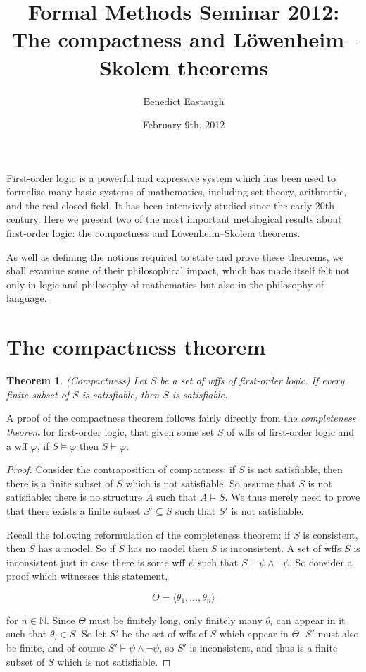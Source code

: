 \documentclass[10pt, a4paper, oneside]{article}
\title{Formal Methods Seminar 2012:\\
       The compactness and Löwenheim--Skolem theorems}
\author{Benedict Eastaugh}
\date{February 9th, 2012}
\newtheorem{thm}{Theorem}[section]
\theoremstyle{definition}
\theoremstyle{remark}
\theoremstyle{plain}
\begin{document}
\maketitle

First-order logic is a powerful and expressive system which has been used to
formalise many basic systems of mathematics, including set theory, arithmetic,
and the real closed field. It has been intensively studied since the early 20th
century. Here we present two of the most important metalogical results about
first-order logic: the compactness and Löwenheim--Skolem theorems.

As well as defining the notions required to state and prove these theorems, we
shall examine some of their philosophical impact, which has made itself felt not
only in logic and philosophy of mathematics but also in the philosophy of
language.


\section{The compactness theorem}

\begin{thm}
    (Compactness) Let $S$ be a set of wffs of first-order logic. If every finite
    subset of $S$ is satisfiable, then $S$ is satisfiable.
\end{thm}

A proof of the compactness theorem follows fairly directly from the
\emph{completeness theorem} for first-order logic, that given some set $S$ of
wffs of first-order logic and a wff $\varphi$, if $S \models \varphi$ then
$S \vdash \varphi$.

\begin{proof}
    Consider the contraposition of compactness: if $S$ is not satisfiable, then
    there is a finite subset of $S$ which is not satisfiable. So assume that $S$
    is not satisfiable: there is no structure $A$ such that $A \models S$. We
    thus merely need to prove that there exists a finite subset $S' \subseteq S$
    such that $S'$ is not satisfiable.
    
    Recall the following reformulation of the completeness theorem: if $S$ is
    consistent, then $S$ has a model. So if $S$ has no model then $S$ is
    inconsistent. A set of wffs $S$ is inconsistent just in case there is some
    wff $\psi$ such that $S \vdash \psi \wedge \neg\psi$. So consider a proof
    which witnesses this statement,
    
    \begin{displaymath}
        \Theta = \langle \theta_1, \dotsc, \theta_n \rangle
    \end{displaymath}
    
    for $n \in \mathbb{N}$. Since $\Theta$ must be finitely long, only finitely
    many $\theta_i$ can appear in it such that $\theta_i \in S$. So let $S'$ be
    the set of wffs of $S$ which appear in $\Theta$. $S'$ must also be finite,
    and of course $S' \vdash \psi \wedge \neg\psi$, so $S'$ is inconsistent, and
    thus is a finite subset of $S$ which is not satisfiable.
\end{proof}
\end{document}
